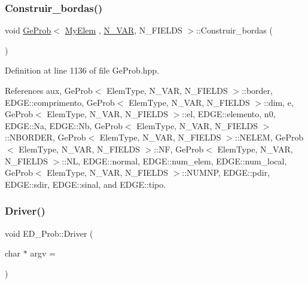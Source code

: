 \subsubsection{\texorpdfstring{Construir\+\_\+bordas()}{Construir\_bordas()}}
{\footnotesize\ttfamily void \hyperlink{classGeProb}{Ge\+Prob}$<$ \hyperlink{DG__Prob_8h_a83cd887ced9a6587428f267e50cd4787}{My\+Elem} , \hyperlink{classED__Prob_a4e7d2ff1a8e435e336fb00c527224b5a}{N\+\_\+\+V\+AR}, N\+\_\+\+F\+I\+E\+L\+DS $>$\+::Construir\+\_\+bordas (\begin{DoxyParamCaption}{ }\end{DoxyParamCaption})\hspace{0.3cm}{\ttfamily [inherited]}}



Definition at line 1136 of file Ge\+Prob.\+hpp.



References aux, Ge\+Prob$<$ Elem\+Type, N\+\_\+\+V\+A\+R, N\+\_\+\+F\+I\+E\+L\+D\+S $>$\+::border, E\+D\+G\+E\+::comprimento, Ge\+Prob$<$ Elem\+Type, N\+\_\+\+V\+A\+R, N\+\_\+\+F\+I\+E\+L\+D\+S $>$\+::dim, e, Ge\+Prob$<$ Elem\+Type, N\+\_\+\+V\+A\+R, N\+\_\+\+F\+I\+E\+L\+D\+S $>$\+::el, E\+D\+G\+E\+::elemento, n0, E\+D\+G\+E\+::\+Na, E\+D\+G\+E\+::\+Nb, Ge\+Prob$<$ Elem\+Type, N\+\_\+\+V\+A\+R, N\+\_\+\+F\+I\+E\+L\+D\+S $>$\+::\+N\+B\+O\+R\+D\+ER, Ge\+Prob$<$ Elem\+Type, N\+\_\+\+V\+A\+R, N\+\_\+\+F\+I\+E\+L\+D\+S $>$\+::\+N\+E\+L\+EM, Ge\+Prob$<$ Elem\+Type, N\+\_\+\+V\+A\+R, N\+\_\+\+F\+I\+E\+L\+D\+S $>$\+::\+NF, Ge\+Prob$<$ Elem\+Type, N\+\_\+\+V\+A\+R, N\+\_\+\+F\+I\+E\+L\+D\+S $>$\+::\+NL, E\+D\+G\+E\+::normal, E\+D\+G\+E\+::num\+\_\+elem, E\+D\+G\+E\+::num\+\_\+local, Ge\+Prob$<$ Elem\+Type, N\+\_\+\+V\+A\+R, N\+\_\+\+F\+I\+E\+L\+D\+S $>$\+::\+N\+U\+M\+NP, E\+D\+G\+E\+::pdir, E\+D\+G\+E\+::sdir, E\+D\+G\+E\+::sinal, and E\+D\+G\+E\+::tipo.

\mbox{\label{classED__Prob_a1511a0a4eb81a3958d13ebe741b8d49c}} 
\subsubsection{\texorpdfstring{Driver()}{Driver()}}
{\footnotesize\ttfamily void E\+D\+\_\+\+Prob\+::\+Driver (\begin{DoxyParamCaption}\item[{char $\ast$}]{argv = {} }\end{DoxyParamCaption})}

